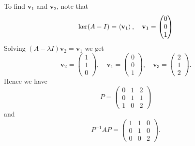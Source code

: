 \documentclass[a4paper]{article}
\begin{document}
\begin{example}
	To find $\mathbf{v}_1$ and $\mathbf{v}_2$, note that 
	\[
		\ker (A-I) = \left\langle{} \mathbf{v}_1 \right\rangle,\quad \mathbf{v}_1 = \begin{pmatrix}
			 0 \\
			 0 \\
			 1 \\
		\end{pmatrix}
	\]
	Solving $ (A-\lambda I)\mathbf{v}_2 = \mathbf{v}_1 $ we get 
	\[
		\mathbf{v}_2 =
		\begin{pmatrix}
		  1\\1\\0
		\end{pmatrix},\quad
		\mathbf{v}_1 =
		\begin{pmatrix}
		  0\\0\\1
		\end{pmatrix},\quad
		\mathbf{v}_3 =
		\begin{pmatrix}
		  2\\1\\2
		\end{pmatrix}.
	  \]
	Hence we have
	\[
	  P =
	  \begin{pmatrix}
		0 & 1 & 2\\
		0 & 1 & 1\\
		1 & 0 & 2
	  \end{pmatrix}
	\]
	and
	\[
	  P^{-1} AP = \begin{pmatrix}
		1 & 1 & 0\\
		0 & 1 & 0\\
		0 & 0 & 2
	  \end{pmatrix}.
	\]
  \end{example}
\end{document}
